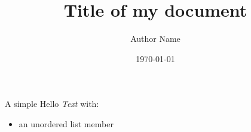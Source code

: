\documentclass{article} %
\author{Author Name} %
\title{Title of my document} %
\date{\today} %
\begin{document}
\maketitle

A simple Hello \emph{Text} %
with:
\begin{itemize} %
\item an unordered list member
\end{itemize} 
\end{document}
